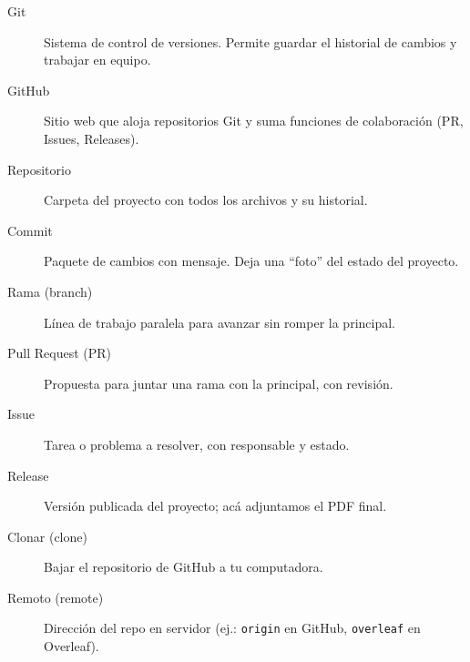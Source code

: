 \begin{description}
  \item[Git] Sistema de control de versiones. Permite guardar el historial de cambios y trabajar en equipo.
  \item[GitHub] Sitio web que aloja repositorios Git y suma funciones de colaboración (PR, Issues, Releases).
  \item[Repositorio] Carpeta del proyecto con todos los archivos y su historial.
  \item[Commit] Paquete de cambios con mensaje. Deja una “foto” del estado del proyecto.
  \item[Rama (branch)] Línea de trabajo paralela para avanzar sin romper la principal.
  \item[Pull Request (PR)] Propuesta para juntar una rama con la principal, con revisión.
  \item[Issue] Tarea o problema a resolver, con responsable y estado.
  \item[Release] Versión publicada del proyecto; acá adjuntamos el PDF final.
  \item[Clonar (clone)] Bajar el repositorio de GitHub a tu computadora.
  \item[Remoto (remote)] Dirección del repo en servidor (ej.: \texttt{origin} en GitHub, \texttt{overleaf} en Overleaf).
\end{description}

